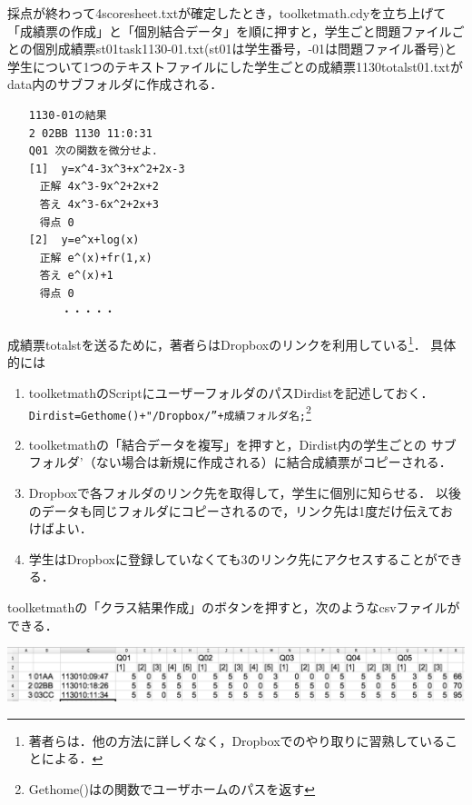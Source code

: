 \documentclass[a4j,12pt]{ujarticle}
\begin{document}
採点が終わって4scoresheet.txtが確定したとき，toolketmath.cdyを立ち上げて
「成績票の作成」と「個別結合データ」を順に押すと，学生ごと問題ファイルごとの個別成績票st01task1130-01.txt(st01は学生番号，-01は問題ファイル番号)と学生について1つのテキストファイルにした学生ごとの成績票1130totalst01.txtがdata内のサブフォルダに作成される．\vspace{-0.5zw}

\begin{verbatim}
　　1130-01の結果
　　2 02BB 1130 11:0:31
　　Q01 次の関数を微分せよ．
　　[1]  y=x^4-3x^3+x^2+2x-3
　　　正解 4x^3-9x^2+2x+2
　　　答え 4x^3-6x^2+2x+3
　　　得点 0
　　[2]  y=e^x+log(x)
　　　正解 e^(x)+fr(1,x)
　　　答え e^(x)+1
　　　得点 0
　　　　　・・・・・
\end{verbatim}
\vspace{-0.5zw}

成績票totalstを送るために，著者らはDropboxのリンクを利用している\footnote{著者らは．他の方法に詳しくなく，Dropboxでのやり取りに習熟していることによる．}．%
具体的には\vspace{-1mm}

\begin{enumerate}
\item toolketmathのScriptにユーザーフォルダのパスDirdistを記述しておく．\\
\hspace*{2zw}\verb|Dirdist=Gethome()+"/Dropbox/”+成績フォルダ名;|\footnote{Gethome()は\ketcindy の関数でユーザホームのパスを返す}\vspace{-2mm}
\item toolketmathの「結合データを複写」を押すと，Dirdist内の学生ごとの
サブフォルダ’（ない場合は新規に作成される）に結合成績票がコピーされる．\vspace{-2mm}
\item Dropboxで各フォルダのリンク先を取得して，学生に個別に知らせる．
以後のデータも同じフォルダにコピーされるので，リンク先は1度だけ伝えておけばよい．\vspace{-2mm}
\item 学生はDropboxに登録していなくても3のリンク先にアクセスすることができる．
\end{enumerate}\vspace{-1mm}

toolketmathの「クラス結果作成」のボタンを押すと，次のようなcsvファイルができる．
\begin{center}
\includegraphics[bb=0.00 0.00 1184.00 141.00,width=140mm]{fig/csvbw.pdf}
\end{center}
\end{document}
